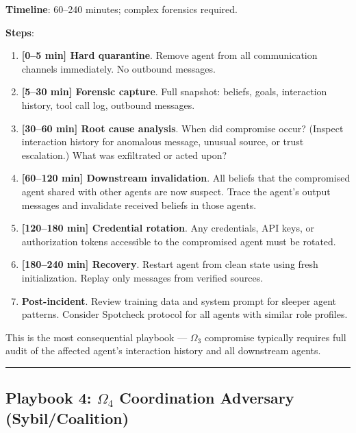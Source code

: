 \documentclass[
]{article}
\providecommand{\tightlist}{%
  \setlength{\itemsep}{0pt}\setlength{\parskip}{0pt}}
\begin{document}
\textbf{Timeline}: 60--240 minutes; complex forensics required.

\textbf{Steps}:

\begin{enumerate}
\def\labelenumi{\arabic{enumi}.}
\tightlist
\item
  \textbf{{[}0--5 min{]} Hard quarantine}. Remove agent from all
  communication channels immediately. No outbound messages.
\item
  \textbf{{[}5--30 min{]} Forensic capture}. Full snapshot: beliefs,
  goals, interaction history, tool call log, outbound messages.
\item
  \textbf{{[}30--60 min{]} Root cause analysis}. When did compromise
  occur? (Inspect interaction history for anomalous message, unusual
  source, or trust escalation.) What was exfiltrated or acted upon?
\item
  \textbf{{[}60--120 min{]} Downstream invalidation}. All beliefs that
  the compromised agent shared with other agents are now suspect. Trace
  the agent's output messages and invalidate received beliefs in those
  agents.
\item
  \textbf{{[}120--180 min{]} Credential rotation}. Any credentials, API
  keys, or authorization tokens accessible to the compromised agent must
  be rotated.
\item
  \textbf{{[}180--240 min{]} Recovery}. Restart agent from clean state
  using fresh initialization. Replay only messages from verified
  sources.
\item
  \textbf{Post-incident}. Review training data and system prompt for
  sleeper agent patterns. Consider Spotcheck protocol for all agents
  with similar role profiles.
\end{enumerate}

This is the most consequential playbook --- \(\Omega_3\) compromise
typically requires full audit of the affected agent's interaction
history and all downstream agents.

\begin{center}\rule{0.5\linewidth}{0.5pt}\end{center}

\subsection{\texorpdfstring{Playbook 4: \(\Omega_4\) Coordination
Adversary
(Sybil/Coalition)}{Playbook 4: Omega_4 Coordination Adversary (Sybil/Coalition)}}\label{playbook-4-omega_4-coordination-adversary-sybilcoalition}
\end{document}
